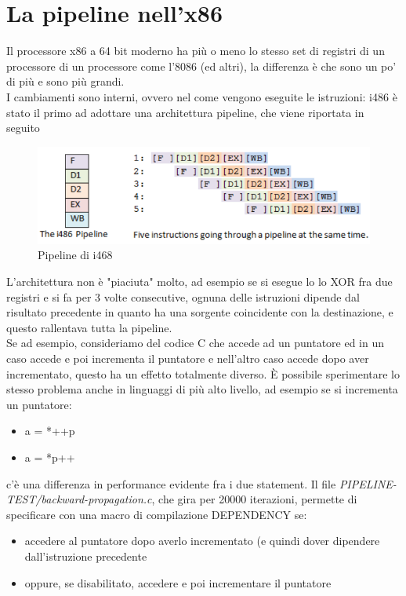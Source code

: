 \documentclass[14pt, oneside]{book}
\begin{document}
\section{La pipeline nell'x86}
Il processore x86 a 64 bit moderno ha più o meno lo stesso set di registri di un processore di un processore come l'8086 (ed altri), la differenza è che sono un po' di più e sono più grandi.\\ I cambiamenti sono interni, ovvero nel come vengono eseguite le istruzioni: i486 è stato il primo ad adottare una architettura pipeline, che viene riportata in seguito
\begin{figure}[ht!]
\includegraphics[scale=0.4]{immagini/pipeline-i486}
\caption{Pipeline di i468}
\end{figure}
L'architettura non è "piaciuta" molto, ad esempio se si esegue lo lo XOR fra due registri e si fa per 3 volte consecutive, ognuna delle istruzioni dipende dal risultato precedente in quanto ha una sorgente coincidente con la destinazione, e questo rallentava tutta la pipeline.\\ Se ad esempio, consideriamo del codice C che accede ad un puntatore ed in un caso accede e poi incrementa il puntatore e nell'altro caso accede dopo aver incrementato, questo ha un effetto totalmente diverso. È possibile sperimentare lo stesso problema anche in linguaggi di più alto livello, ad esempio se si incrementa un puntatore:
\begin{itemize}
\item a = *++p
\item a = *p++
\end{itemize}
c'è una differenza in performance evidente fra i due statement. Il file \textit{PIPELINE-TEST/backward-propagation.c}, che gira per 20000 iterazioni, permette di specificare con una macro di compilazione DEPENDENCY se:
\begin{itemize}
\item accedere al puntatore dopo averlo incrementato (e quindi dover dipendere dall'istruzione precedente
\item oppure, se disabilitato, accedere e poi incrementare il puntatore
\end{itemize} 
\end{document}
